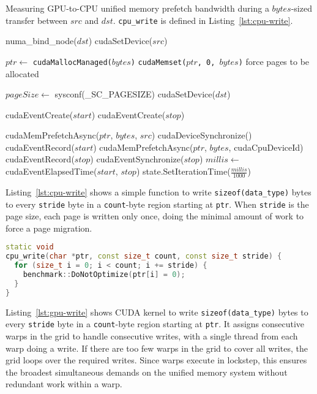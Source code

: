 \begin{algorithm}[H]
	\caption[Measuring GPU-to-CPU unified memory prefetch bandwidth.]{
		Measuring GPU-to-CPU unified memory prefetch bandwidth during a $bytes$-sized transfer between $src$ and $dst$.
		\texttt{cpu\_write} is defined in Listing~\ref{lst:cpu-write}.
	}
	\label{alg:um-prefetch-bw-gpu-cpu}
	\begin{algorithmic}[1]
		\Statex
		
		\State numa\_bind\_node($dst$)
		\State cudaSetDevice($src$)

		\State $ptr \gets$ \texttt{cudaMallocManaged($bytes$)}
		\State \texttt{cudaMemset($ptr$, 0, $bytes$)} \Comment force pages to be allocated

		\State $pageSize \gets$ sysconf(\_SC\_PAGESIZE)
		\State cudaSetDevice($dst$)

		\State cudaEventCreate($start$)
		\State cudaEventCreate($stop$)		        
				
			\State cudaMemPrefetchAsync($ptr$, $bytes$, $src$)
			\State cudaDeviceSynchronize()
			\State cudaEventRecord($start$)
			\State cudaMemPrefetchAsync($ptr$, $bytes$, cudaCpuDeviceId)
			\State cudaEventRecord($stop$)
			\State cudaEventSynchronize($stop$)
			\State $millis \gets$ cudaEventElapsedTime($start$, $stop$)
			\State state.SetIterationTime($\frac{millis}{1000}$)
		\EndFor
		\EndFunction			
	\end{algorithmic}
\end{algorithm}


Listing~\ref{lst:cpu-write} shows a simple function to write \texttt{sizeof(data\_type)} bytes to every \texttt{stride} byte in a \texttt{count}-byte region starting at \texttt{ptr}.
When \texttt{stride} is the page size, each page is written only once, doing the minimal amount of work to force a page migration.

\begin{minipage}{\textwidth}
\begin{lstlisting}[language=c++, caption=\texttt{cpu\_write} function., label=lst:cpu-write]
static void 
cpu_write(char *ptr, const size_t count, const size_t stride) {
  for (size_t i = 0; i < count; i += stride) {
    benchmark::DoNotOptimize(ptr[i] = 0);
  }
}
\end{lstlisting}
\end{minipage}

Listing~\ref{lst:gpu-write} shows CUDA kernel to write \texttt{sizeof(data\_type)} bytes to every \texttt{stride} byte in a \texttt{count}-byte region starting at \texttt{ptr}.
It assigns consecutive warps in the grid to handle consecutive writes, with a single thread from each warp doing a write.
If there are too few warps in the grid to cover all writes, the grid loops over the required writes.
Since warps execute in lockstep, this ensures the broadest simultaneous demands on the unified memory system without redundant work within a warp.

